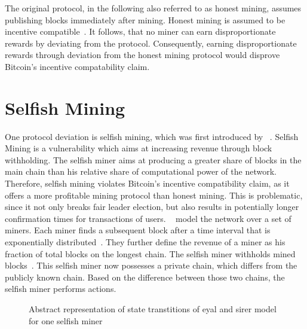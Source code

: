 The original protocol, in the following also referred to as honest mining, assumes publishing blocks immediately after mining. Honest mining is assumed to be incentive compatible~\cite{1}. It follows, that no miner can earn disproportionate rewards by deviating from the protocol.
Consequently, earning disproportionate rewards through deviation from the honest mining protocol would disprove Bitcoin's incentive compatability claim.

\section{Selfish Mining}\label{eyalmodel}
One protocol deviation is selfish mining, which was first introduced by \citeauthor{eyal}~\cite{eyal}.
Selfish Mining is a vulnerability which aims at increasing revenue through block withholding. The selfish miner aims at producing a greater share of blocks in the main chain than his relative share of computational power of the network. Therefore, selfish mining violates Bitcoin's incentive compatibility claim, as it offers a more profitable mining protocol than honest mining. This is problematic, since it not only breaks fair leader election, but also results in potentially longer confirmation times for transactions of users.
~\citeauthor{eyal} model the network over a set of miners. Each miner finds a subsequent block after a time interval that is exponentially distributed~\cite{eyal}. They further define the revenue of a miner as his fraction of total blocks on the longest chain.
The selfish miner withholds mined blocks~\cite{eyal}. This selfish miner now possesses a private chain, which differs from the publicly known chain. Based on the difference between those two chains, the selfish miner performs actions. 
\begin{figure}[t]
\begin{center}
\end{center}
   \caption{Abstract representation of state transtitions of eyal and sirer model for one selfish miner}
\label{fig:eyal_model}

\end{figure}
